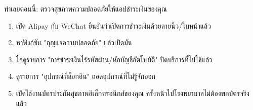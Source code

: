\begin{tcbpractice}{ทำเลยตอนนี้: ตรวจสุขภาพความปลอดภัยให้แอปชำระเงินของคุณ}
\begin{enumerate}
  \item เปิด Alipay กับ WeChat ยืนยันว่าเปิดการชำระเงินด้วยลายนิ้ว/ใบหน้าแล้ว
  \item หาฟังก์ชัน "กุญแจความปลอดภัย" แล้วเปิดมัน
  \item ไล่ดูรายการ "การชำระเงินไร้รหัสผ่าน/หักบัญชีอัตโนมัติ" ปิดบริการที่ไม่ใช้แล้ว
  \item ดูรายการ "อุปกรณ์ที่ล็อกอิน" ถอดอุปกรณ์ที่ไม่รู้จักออก
  \item เปิดใช้งานบัตรประกันสุขภาพอิเล็กทรอนิกส์ของคุณ ครั้งหน้าไปโรงพยาบาลไม่ต้องพกบัตรจริงแล้ว
\end{enumerate}

\end{tcbpractice}
